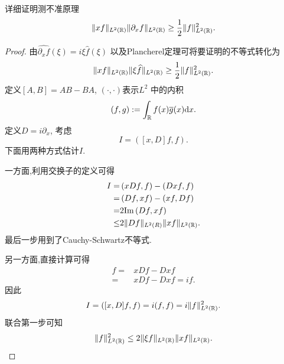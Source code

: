 \begin{exercise}
  详细证明测不准原理
  \[
    \|xf\|_{L^2(\mathbb{R})}\|\partial_x f\|_{L^{2}(\mathbb{R})}\ge \frac{1}{2}\|f\|^2_{L^2(\mathbb{R})}.
  \] 
\end{exercise}
\begin{proof}
  由$\widehat{\partial_x f}(\xi)=i\xi\widehat{f}(\xi)$ 以及Plancherel定理可将要证明的不等式转化为
  \[
    \|xf\|_{L^2(\mathbb{R})}\|\xi \widehat{f}\|_{L^2(\mathbb{R})}\ge \frac{1}{2}\|f\|^2_{L^2(\mathbb{R})}.
  \] 
  定义$[A,B]=AB-BA$, $(\cdot ,\cdot )$表示$L^2$ 中的内积
  \[
    (f,g):=\int_{\mathbb{R}}f(x)\overline{g}(x)\mathrm{d}x.
  \] 
定义$D=i\partial_x$, 考虑
  \[
    I=\left( [x,D]f,f \right) .
  \] 
  下面用两种方式估计$I$.

  一方面,利用交换子的定义可得
   \begin{align*}
     I= & \left( xDf,f \right) -\left( Dxf,f \right) \\
     = & \left( Df,xf \right) -\left( xf,Df \right) \\
     = & 2 \mathrm{Im} \left( Df,xf \right) \\
     \le & 2 \|Df\|_{L^2(R)}\|xf\|_{L^2(\mathbb{R})}.
  \end{align*}
最后一步用到了Cauchy-Schwartz不等式.

另一方面,直接计算可得
\begin{align*}
  [x,D]f = & xDf-Dxf\\
  = & xDf-Dxf=if.
\end{align*}
因此
\[
  I=\left( [x,D]f,f \right) =i(f,f)=i\|f\|^2_{L^2(\mathbb{R})}.
\] 
联合第一步可知
\[
  \|f\|^2_{L^2(\mathbb{R})}\le 2 \|\xi f\|_{L^2(\mathbb{R})}\|xf\|_{L^2(\mathbb{R})}.
\] 
\end{proof}

